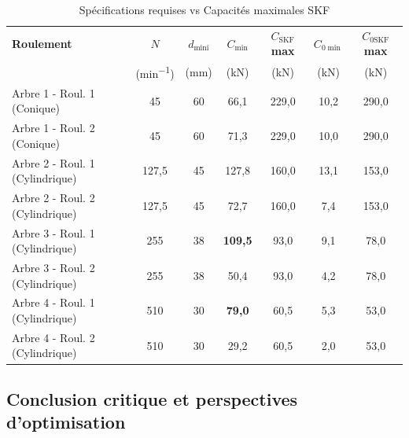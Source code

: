 \documentclass[11pt,a4paper]{article}
\begin{document}
\begin{table}[H]
    \centering
    \caption{Spécifications requises vs Capacités maximales SKF}
    \label{tab:synthese_roulements}
    \small
    \begin{tabular}{l c c c c c c}
        \toprule
        \textbf{Roulement} & \textbf{$N$} & \textbf{$d_{\text{mini}}$} & \textbf{$C_{\min}$} & \textbf{$C_{\text{SKF}}$ max} & \textbf{$C_{0\min}$} & \textbf{$C_{0\text{SKF}}$ max} \\
                           & (\unit{\minute^{-1}}) & (\unit{\milli\meter}) & (\unit{\kilo\newton}) & (\unit{\kilo\newton}) & (\unit{\kilo\newton}) & (\unit{\kilo\newton}) \\
        \midrule
        Arbre 1 - Roul. 1 (Conique)     & 45      & 60 & 66{,}1  & 229{,}0 & 10{,}2 & 290{,}0 \\
        Arbre 1 - Roul. 2 (Conique)     & 45      & 60 & 71{,}3  & 229{,}0 & 10{,}0 & 290{,}0 \\
        \midrule
        Arbre 2 - Roul. 1 (Cylindrique) & 127{,}5 & 45 & 127{,}8 & 160{,}0 & 13{,}1 & 153{,}0 \\
        Arbre 2 - Roul. 2 (Cylindrique) & 127{,}5 & 45 & 72{,}7  & 160{,}0 & 7{,}4  & 153{,}0 \\
        \midrule
        Arbre 3 - Roul. 1 (Cylindrique) & 255     & 38 & \textbf{109{,}5} & 93{,}0  & 9{,}1  & 78{,}0 \\
        Arbre 3 - Roul. 2 (Cylindrique) & 255     & 38 & 50{,}4  & 93{,}0  & 4{,}2  & 78{,}0 \\
        \midrule
        Arbre 4 - Roul. 1 (Cylindrique) & 510     & 30 & \textbf{79{,}0}  & 60{,}5  & 5{,}3  & 53{,}0 \\
        Arbre 4 - Roul. 2 (Cylindrique) & 510     & 30 & 29{,}2  & 60{,}5  & 2{,}0  & 53{,}0 \\
        \bottomrule
    \end{tabular}
\end{table}

\subsection{Conclusion critique et perspectives d'optimisation}
\end{document}
